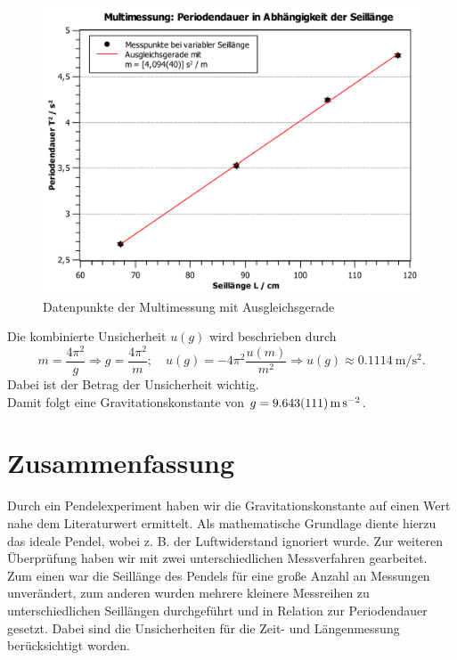 \documentclass[11pt,a4paper,titlepage, ngerman]{article}
\begin{document}
		\begin{figure}[ht]
			\centering
			\includegraphics[width=\textwidth]{SteigungMultimessung_2.pdf}
			\caption{Datenpunkte der Multimessung mit Ausgleichsgerade}
			\label{fig:multi}
		\end{figure}
		
		Die kombinierte Unsicherheit $u(g)$ wird beschrieben durch
		\begin{equation*}
			m = \frac{4 \pi^2}{g} \Rightarrow g = \frac{4 \pi^2}{m};\quad 
			u(g) = -4\pi^2 \frac{u(m)}{m^2} \Rightarrow u(g) \approx \SI{0,1114}{\meter\per\second\squared}.
		\end{equation*}
		Dabei ist der Betrag der Unsicherheit wichtig.\\
		Damit folgt eine Gravitationskonstante von $g = \SI{9,643 +- 0,111}{\meter\per\second\squared}$.
		
	\section{Zusammenfassung}
		Durch ein Pendelexperiment haben wir die Gravitationskonstante auf einen Wert nahe dem Literaturwert ermittelt.
		Als mathematische Grundlage diente hierzu das ideale Pendel, wobei z. B. der Luftwiderstand ignoriert wurde.
		Zur weiteren Überprüfung haben wir mit zwei unterschiedlichen Messverfahren gearbeitet.
		Zum einen war die Seillänge des Pendels für eine große Anzahl an Messungen unverändert, zum anderen wurden mehrere kleinere Messreihen zu unterschiedlichen Seillängen durchgeführt und in Relation zur Periodendauer gesetzt.
		Dabei sind die Unsicherheiten für die Zeit- und Längenmessung berücksichtigt worden.
		
\end{document}
